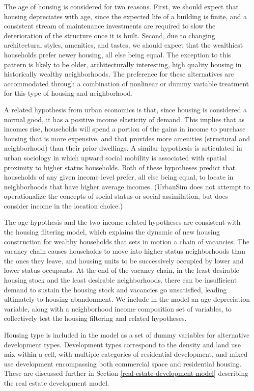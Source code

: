 \documentclass[fleqn]{article}
\begin{document}
The age of housing is considered for two reasons.  First, we
should expect that housing depreciates with age, since the
expected life of a building is finite, and a consistent stream of
maintenance investments are required to slow the deterioration of
the structure once it is built.  Second, due to changing
architectural styles, amenities, and tastes, we should expect that
the wealthiest households prefer newer housing, all else being
equal.  The exception to this pattern is likely to be older,
architecturally interesting, high quality housing in historically
wealthy neighborhoods.  The preference for these alternatives are
accommodated through a combination of nonlinear or dummy variable
treatment for this type of housing and neighborhood.

A related hypothesis from urban economics is that, since housing
is considered a normal good, it has a positive income elasticity
of demand.  This implies that as incomes rise, households will
spend a portion of the gains in income to purchase housing that is
more expensive, and that provides more amenities (structural and
neighborhood) than their prior dwellings.  A similar hypothesis is
articulated in urban sociology in which upward social mobility is
associated with spatial proximity to higher status households.
Both of these hypotheses predict that households of any given
income level prefer, all else being equal, to locate in
neighborhoods that have higher average incomes.  (UrbanSim does
not attempt to operationalize the concepts of social status or
social assimilation, but does consider income in the location
choice.)

The age hypothesis and the two income-related hypotheses are
consistent with the housing filtering model, which explains the
dynamic of new housing construction for wealthy households that
sets in motion a chain of vacancies.   The vacancy chain causes
households to move into higher status neighborhoods than the ones
they leave, and housing units to be successively occupied by lower
and lower status occupants.  At the end of the vacancy chain, in
the least desirable housing stock and the least desirable
neighborhoods, there can be insufficient demand to sustain the
housing stock and vacancies go unsatisfied, leading ultimately to
housing abandonment.  We include in the model an age depreciation
variable, along with a neighborhood income composition set of
variables, to collectively test the housing filtering and related
hypotheses.

Housing type is included in the model as a set of dummy variables
for alternative development types.  Development types correspond
to the density and land use mix within a cell, with multiple
categories of residential development, and mixed use development
encompassing both commercial space and residential housing.  These
are discussed further in Section
\ref{real-estate-development-model} describing the real estate
development model.
\end{document}
